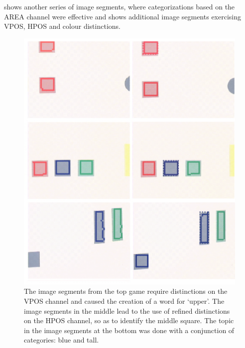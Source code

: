  shows another series of image segments, 
where categorizations based on the AREA channel were effective
and  shows additional image segments exercising
VPOS, HPOS and colour distinctions. 
\begin{figure}
\begin{center}
\includegraphics[width=0.8\columnwidth]{chap7/figs/plate-15-vpos}
\end{center}
\caption{ The image segments from the top game require 
distinctions on the VPOS channel and 
caused the creation of a word for `upper'. The image 
segments in the middle lead to the use of refined
distinctions on the HPOS channel, so as to 
identify the middle square. The topic in the 
image segments at the bottom was done with a 
conjunction of categories: blue and tall.}
\label{fig:plate-15}
\end{figure}

